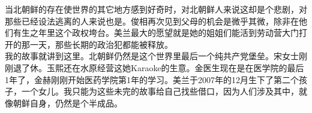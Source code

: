 当北朝鲜的存在使世界的其它地方感到好奇时，对北朝鲜人来说这却是个悲剧，对那些已经设法逃离的人来说也是。俊相再次见到父母的机会是微乎其微，除非在他们有生之年里这个政权垮台。美兰最大的愿望就是她的姐姐们能活到劳动营大门打开的那一天，那些长期的政治犯都能被释放。\\

我的故事就讲到这里。北朝鲜仍然是这个世界里最后一个纯共产党堡垒。宋女士刚刚退了休。玉熙还在水原经营这她Karaoke的生意。金医生现在是在医学院的最后1年了，金赫刚刚开始医药学院第1年的学习。美兰于2007年的12月生下了第二个孩子，一个女儿。我只能为这些未完的故事给自己找些借口，因为人们涉及其中，就像朝鲜自身，仍然是个半成品。\\
